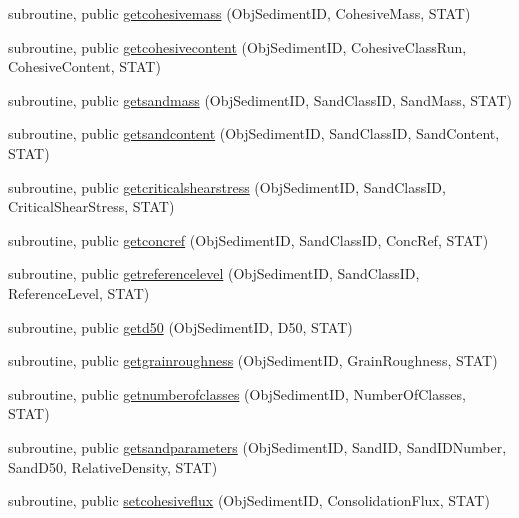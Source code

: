 \begin{DoxyCompactItemize}
\item 
subroutine, public \mbox{\hyperlink{namespacemodulesediment_ae44dda471948f0f9a9a2e1c32fd50738}{getcohesivemass}} (Obj\+Sediment\+ID, Cohesive\+Mass, S\+T\+AT)
\item 
subroutine, public \mbox{\hyperlink{namespacemodulesediment_a595e3a876982089ba4949f113b1a0580}{getcohesivecontent}} (Obj\+Sediment\+ID, Cohesive\+Class\+Run, Cohesive\+Content, S\+T\+AT)
\item 
subroutine, public \mbox{\hyperlink{namespacemodulesediment_a7bb4238fb2af1033061fd9f1fdf674dc}{getsandmass}} (Obj\+Sediment\+ID, Sand\+Class\+ID, Sand\+Mass, S\+T\+AT)
\item 
subroutine, public \mbox{\hyperlink{namespacemodulesediment_ab155d890675462bce376e88c657ed0bb}{getsandcontent}} (Obj\+Sediment\+ID, Sand\+Class\+ID, Sand\+Content, S\+T\+AT)
\item 
subroutine, public \mbox{\hyperlink{namespacemodulesediment_a8d9dd5db543a7e0c9baac18bef6dffcf}{getcriticalshearstress}} (Obj\+Sediment\+ID, Sand\+Class\+ID, Critical\+Shear\+Stress, S\+T\+AT)
\item 
subroutine, public \mbox{\hyperlink{namespacemodulesediment_a1ace217828c80197497b60fcaad2f95b}{getconcref}} (Obj\+Sediment\+ID, Sand\+Class\+ID, Conc\+Ref, S\+T\+AT)
\item 
subroutine, public \mbox{\hyperlink{namespacemodulesediment_ad8d5d321d848d9df2cc84a9c53bc5ec1}{getreferencelevel}} (Obj\+Sediment\+ID, Sand\+Class\+ID, Reference\+Level, S\+T\+AT)
\item 
subroutine, public \mbox{\hyperlink{namespacemodulesediment_aa0d71895956b87280c4aa42094f08fdd}{getd50}} (Obj\+Sediment\+ID, D50, S\+T\+AT)
\item 
subroutine, public \mbox{\hyperlink{namespacemodulesediment_ac873ffbc4a1e0467d82815aeb2ad34cc}{getgrainroughness}} (Obj\+Sediment\+ID, Grain\+Roughness, S\+T\+AT)
\item 
subroutine, public \mbox{\hyperlink{namespacemodulesediment_a1b6836cb590222a61d3ec36961ce22c2}{getnumberofclasses}} (Obj\+Sediment\+ID, Number\+Of\+Classes, S\+T\+AT)
\item 
subroutine, public \mbox{\hyperlink{namespacemodulesediment_a283894d1d09fefa91f63082646eea486}{getsandparameters}} (Obj\+Sediment\+ID, Sand\+ID, Sand\+I\+D\+Number, Sand\+D50, Relative\+Density, S\+T\+AT)
\item 
subroutine, public \mbox{\hyperlink{namespacemodulesediment_ab6753fbc97e7e46e60797defc442a36e}{setcohesiveflux}} (Obj\+Sediment\+ID, Consolidation\+Flux, S\+T\+AT)

\end{DoxyCompactItemize}
